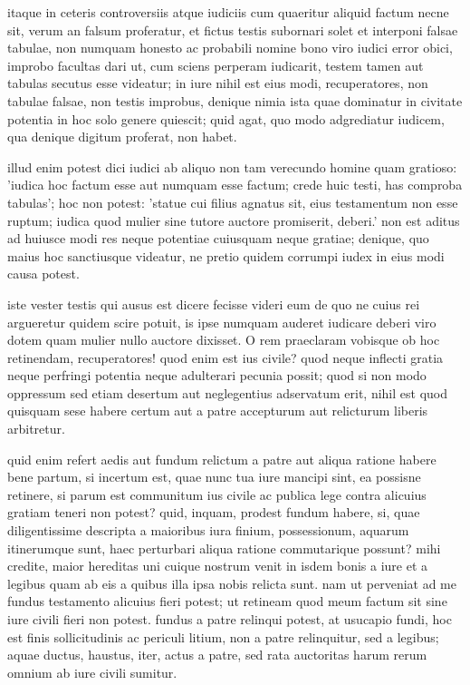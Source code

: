  itaque in ceteris controversiis atque iudiciis cum quaeritur aliquid factum necne sit, verum an falsum proferatur, et fictus testis subornari solet et interponi falsae tabulae, non numquam honesto ac probabili nomine bono viro iudici error obici, improbo facultas dari ut, cum sciens perperam iudicarit, testem tamen aut tabulas secutus esse videatur; in iure nihil est eius modi, recuperatores, non tabulae falsae, non testis improbus, denique nimia ista quae dominatur in civitate potentia in hoc solo genere quiescit; quid agat, quo modo adgrediatur iudicem, qua denique digitum proferat, non habet.

 illud enim potest dici iudici ab aliquo non tam verecundo homine quam gratioso: 'iudica hoc factum esse aut numquam esse factum; crede huic testi, has comproba tabulas'; hoc non potest: 'statue cui filius agnatus sit, eius testamentum non esse ruptum; iudica quod mulier sine tutore auctore promiserit, deberi.' non est aditus ad huiusce modi res neque potentiae cuiusquam neque gratiae; denique, quo maius hoc sanctiusque videatur, ne pretio quidem corrumpi iudex in eius modi causa potest.

 iste vester testis qui ausus est dicere fecisse videri eum de quo ne cuius rei argueretur quidem scire potuit, is ipse numquam auderet iudicare deberi viro dotem quam mulier nullo auctore dixisset. O rem praeclaram vobisque ob hoc retinendam, recuperatores! quod enim est ius civile? quod neque inflecti gratia neque perfringi potentia neque adulterari pecunia possit; quod si non modo oppressum sed etiam desertum aut neglegentius adservatum erit, nihil est quod quisquam sese habere certum aut a patre accepturum aut relicturum liberis arbitretur.

 quid enim refert aedis aut fundum relictum a patre aut aliqua ratione habere bene partum, si incertum est, quae nunc tua iure mancipi sint, ea possisne retinere, si parum est communitum ius civile ac publica lege contra alicuius gratiam teneri non potest? quid, inquam, prodest fundum habere, si, quae diligentissime descripta a maioribus iura finium, possessionum, aquarum itinerumque sunt, haec perturbari aliqua ratione commutarique possunt? mihi credite, maior hereditas uni cuique nostrum venit in isdem bonis a iure et a legibus quam ab eis a quibus illa ipsa nobis relicta sunt. nam ut perveniat ad me fundus testamento alicuius fieri potest; ut retineam quod meum factum sit sine iure civili fieri non potest. fundus a patre relinqui potest, at usucapio fundi, hoc est finis sollicitudinis ac periculi litium, non a patre relinquitur, sed a legibus; aquae ductus, haustus, iter, actus a patre, sed rata auctoritas harum rerum omnium ab iure civili sumitur.

